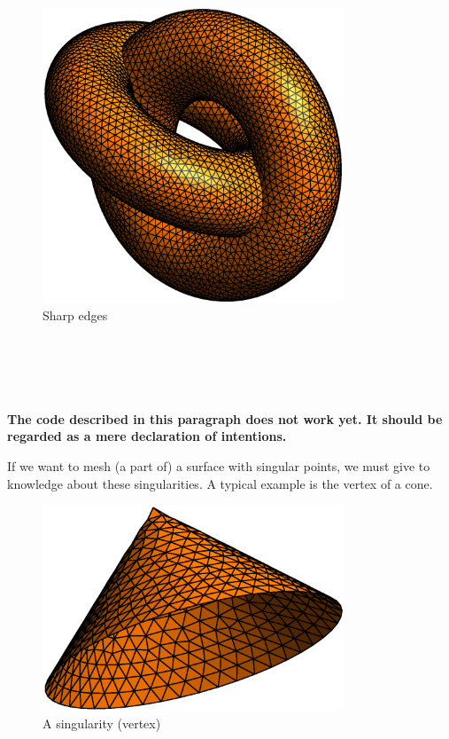 \begin{figure}[ht] \centering
 \includegraphics[width=90mm]{two-tori-sharp}
  \caption{Sharp edges}
  \label{\numb section 3.\numb fig 8}
\end{figure}


\section{~~}\label{\numb section 3.\numb parag 21}

{\normalfont\bfseries The code described in this paragraph does not work yet.
It should be regarded as a mere declaration of intentions.}
\medskip

If we want to mesh (a part of) a surface with singular points, we must give to {\maniFEM}
knowledge about these singularities.
A typical example is the vertex of a cone.

\begin{figure}[ht] \centering
 \includegraphics[width=90mm]{cone}
  \caption{A singularity (vertex)}
  \label{\numb section 3.\numb fig 9}
\end{figure}

